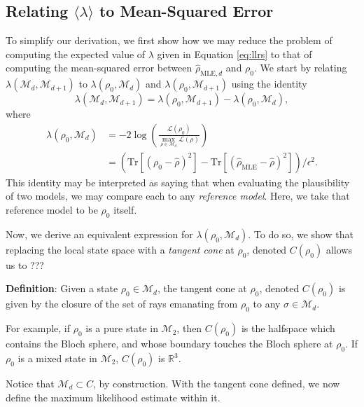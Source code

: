 \documentclass[aps,pra, twocolumn]{revtex4-1}
\newcommand{\M}{\mathcal{M}}
\newcommand{\rhohat}{\hat{\rho}}
\newcommand{\rhoMLE}{\rhohat_{\scriptscriptstyle\mathrm{MLE}}}
\begin{document}
\subsection{Relating $\langle \lambda \rangle$ to Mean-Squared Error}

To simplify our derivation, we first show how we may reduce the problem of computing the expected value of $\lambda$ given in Equation \eqref{eq:llrs} to that of computing the mean-squared error between $\hat{\rho}_{\mathrm{MLE},d}$ and $\rho_{0}$. We start by relating $\lambda(\M_{d},\M_{d+1})$ to $\lambda(\rho_{0}, \M_{d})$ and $\lambda(\rho_{0}, \M_{d+1})$ using the identity
\begin{equation}
\lambda(\mathcal{M}_{d}, \mathcal{M}_{d + 1}) = \lambda(\rho_{0}, \mathcal{M}_{d+1}) - \lambda(\rho_{0}, \mathcal{M}_{d}),
\end{equation}
where
\begin{align}
\nonumber\lambda(\rho_{0}, \mathcal{M}_{d}) &= -2 \log \left(\frac{\mathcal{L}(\rho_{0})}{\underset{\rho \in \mathcal{M}_{d}}{\max}
\mathcal{L}(\rho)}\right)\\
& = (\mathrm{Tr}[(\rho_{0} - \hat{\rho})^{2}]- \mathrm{Tr}[(\rhoMLE - \hat{\rho})^{2}])/\epsilon^{2}.
\end{align}
This identity may be interpreted as saying that when evaluating the plausibility of two models, we may compare each to any \emph{reference model}. Here, we take that reference model to be $\rho_{0}$ itself.

Now, we derive an equivalent expression for $\lambda(\rho_{0}, \M_{d})$. To do so, we show that replacing the local state space with a \emph{tangent cone} at $\rho_{0}$, denoted $C(\rho_{0})$ allows us to ???


\textbf{Definition}: Given a state $\rho_{0}\in \M_{d}$, the tangent cone at $\rho_{0}$, denoted $C(\rho_{0})$ is given by the closure of the set of rays emanating from $\rho_{0}$ to any $\sigma \in \M_{d}$.

For example, if $\rho_{0}$ is a pure state in $\M_{2}$, then $C(\rho_{0})$ is the halfspace which contains the Bloch sphere, and whose boundary touches the Bloch sphere at $\rho_{0}$. If $\rho_{0}$ is a mixed state in $\M_{2}$, $C(\rho_{0})$ is $\mathbb{R}^{3}$.

Notice that $\M_{d} \subset C$, by construction. With the tangent cone defined, we now define the maximum likelihood estimate within it.
\end{document}
